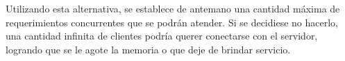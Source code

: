 Utilizando esta alternativa, se establece de antemano una cantidad máxima de requerimientos concurrentes que se podrán atender. Si se decidiese no hacerlo, una cantidad infinita de clientes podría querer conectarse con el servidor, logrando que se le agote la memoria o que deje de brindar servicio.





\clearpage
\printbibliography



